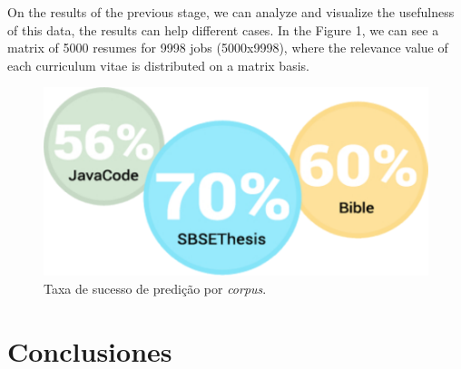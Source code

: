 \documentclass[isoft]{ufgtexposter}
\begin{document}
\begin{poster}
            On the results of the previous stage, we can analyze and visualize the usefulness of this data, the results can help different cases. In the Figure 1, we can see a matrix of 5000 resumes for 9998 jobs (5000x9998), where the relevance value of each curriculum vitae is distributed on a matrix basis.    
            
    
            \begin{figure}
                \centering
                \captionsetup{type=figure}
                \includegraphics[scale=2]{resultado}
                \caption{Taxa de sucesso de predição por \textit{corpus}.}
                \label{fig:result}
            \end{figure}
    
            \lipsum[5]
            \cite{b2}     
    

    
            \lipsum[15]
    
        \section{Conclusiones}
    
            \lipsum[57]
        
    
    
    \end{poster}
\end{document}
